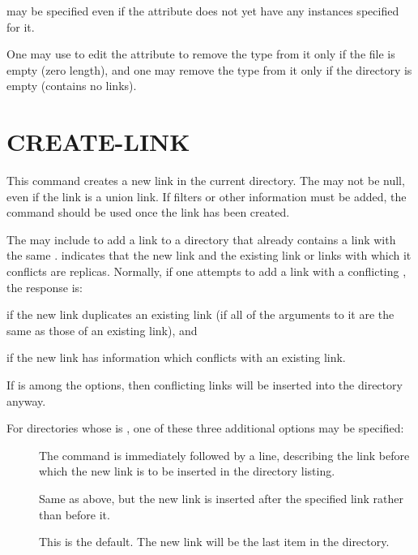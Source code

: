  may
be specified even if the attribute does not yet have any instances
specified for it.

One may use  to edit the 
attribute to remove the  type from it only if the file is
empty (zero length), and one may remove the  type from
it only if the directory is empty (contains no links).


\section{CREATE-LINK}

\begin{command}
  \commandsize
	  \ors {} \metaor {} \ore 
   
   
\zoos{}  \zooe
\end{command}

This command creates a new link in the current directory.   The
 may not be null, even if the link is a union link.  
If filters
or other information must be added, the  command should be
used once the link has been created.

The  may include  to add
a link to a directory that already contains a link with the same
.    indicates  that the new link
and the existing link or links with which it conflicts are replicas.
Normally, if one attempts to add a link with a conflicting
, the response is: 
\begin{command}
\end{command}
if the new link duplicates an existing link (if all of the arguments
to it are the same as those of an existing link), and
\begin{command}
\end{command}
if the new link has information which conflicts with an existing link.

If  is among the options, then conflicting links will be
inserted into the directory anyway.

For directories whose  is ,
one of these three additional options may be specified:
\begin{description}
\item[] The  command is immediately
followed by a  line, describing the link before which the
new link is to be inserted in the directory listing.     
\item[] Same as above, but the new link is inserted after the
specified link rather than before it.
\item[]  This is the default.  The new link will be the last
item in the directory. 
\end{description}

